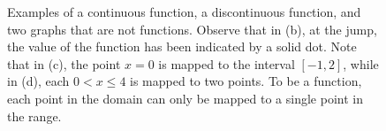     
    \begin{figure}[htb]%
\centering
{}%
\hspace{5pt}%
%
\hspace{5pt}%
%
\hspace{5pt}%
%
    \caption[]{Examples of a continuous function, a discontinuous function, and two graphs that are not functions. Observe that in (b), at the jump, the value of the function has been indicated by a solid dot. Note that in (c), the point $x=0$ is mapped to the interval $[-1, 2]$, while in (d), each $0<x \le 4$ is mapped to two points. To be a function, each point in the domain can only be mapped to a single point in the range.}
    \label{fig:ContinuousVsNot}
\end{figure}

